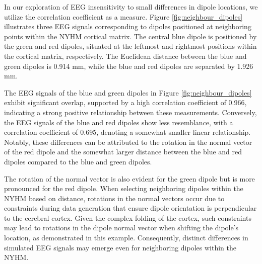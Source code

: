 \documentclass[a4paper, UKenglish, 11pt]{uiomaster}
\begin{document}
In our exploration of EEG insensitivity to small differences in dipole locations, we utilize the correlation coefficient as a measure. Figure \ref{fig:neighbour_dipoles} illustrates three EEG signals corresponding to dipoles positioned at neighboring points within the NYHM cortical matrix. The central blue dipole is positioned by the green and red dipoles, situated at the leftmost and rightmost positions within the cortical matrix, respectively. The Euclidean distance between the blue and green dipoles is 0.914 mm, while the blue and red dipoles are separated by 1.926 mm.

The EEG signals of the blue and green dipoles in Figure \ref{fig:neighbour_dipoles} exhibit significant overlap, supported by a high correlation coefficient of 0.966, indicating a strong positive relationship between these measurements. Conversely, the EEG signals of the blue and red dipoles show less resemblance, with a correlation coefficient of 0.695, denoting a somewhat smaller linear relationship. Notably, these differences can be attributed to the rotation in the normal vector of the red dipole and the somewhat larger distance between the blue and red dipoles compared to the blue and green dipoles.

The rotation of the normal vector is also evident for the green dipole but is more pronounced for the red dipole. When selecting neighboring dipoles within the NYHM based on distance, rotations in the normal vectors occur due to constraints during data generation that ensure dipole orientation is perpendicular to the cerebral cortex. Given the complex folding of the cortex, such constraints may lead to rotations in the dipole normal vector when shifting the dipole's location, as demonstrated in this example. Consequently, distinct differences in simulated EEG signals may emerge even for neighboring dipoles within the NYHM.

\end{document}
